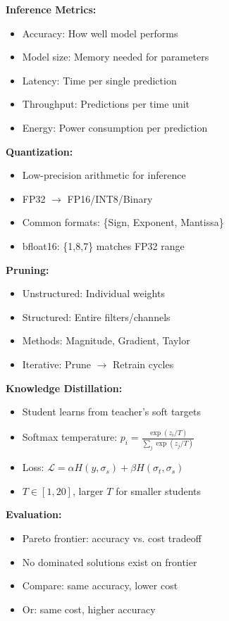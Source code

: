 \documentclass[8pt,letter,landscape]{article}
\begin{document}
\begin{multicols*}{3}
\textbf{Inference Metrics:}
\begin{itemize}[leftmargin=*,nosep]
    \item Accuracy: How well model performs
    \item Model size: Memory needed for parameters
    \item Latency: Time per single prediction
    \item Throughput: Predictions per time unit
    \item Energy: Power consumption per prediction
\end{itemize}

\textbf{Quantization:}
\begin{itemize}[leftmargin=*,nosep]
    \item Low-precision arithmetic for inference
    \item FP32 $\rightarrow$ FP16/INT8/Binary
    \item Common formats: \{Sign, Exponent, Mantissa\}
    \item bfloat16: \{1,8,7\} matches FP32 range
\end{itemize}

\textbf{Pruning:}
\begin{itemize}[leftmargin=*,nosep]
    \item Unstructured: Individual weights
    \item Structured: Entire filters/channels
    \item Methods: Magnitude, Gradient, Taylor
    \item Iterative: Prune $\rightarrow$ Retrain cycles
\end{itemize}

\textbf{Knowledge Distillation:}
\begin{itemize}[leftmargin=*,nosep]
    \item Student learns from teacher's soft targets
    \item Softmax temperature: $p_i = \frac{\exp(z_i/T)}{\sum_j \exp(z_j/T)}$
    \item Loss: $\mathcal{L} = \alpha H(y,\sigma_s) + \beta H(\sigma_t,\sigma_s)$
    \item $T \in [1,20]$, larger $T$ for smaller students
\end{itemize}

\textbf{Evaluation:}
\begin{itemize}[leftmargin=*,nosep]
    \item Pareto frontier: accuracy vs. cost tradeoff
    \item No dominated solutions exist on frontier
    \item Compare: same accuracy, lower cost
    \item Or: same cost, higher accuracy
\end{itemize}


\end{multicols*}
\end{document}
